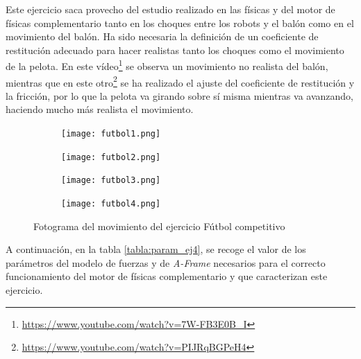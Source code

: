 Este ejercicio saca provecho del estudio realizado en las físicas y del motor de físicas complementario tanto en los choques entre los robots y el balón como en el movimiento del balón. Ha sido necesaria la definición de un coeficiente de restitución adecuado para hacer realistas tanto los choques como el movimiento de la pelota. En este vídeo\footnote{\url{https://www.youtube.com/watch?v=7W-FB3E0B_I}} se observa un movimiento no realista del balón, mientras que en este otro\footnote{\url{https://www.youtube.com/watch?v=PIJRqBGPeH4}} se ha realizado el ajuste del coeficiente de restitución y la fricción, por lo que la pelota va girando sobre sí misma mientras va avanzando, haciendo mucho más realista el movimiento.

\clearpage

\begin{figure}[h!]
  \begin{subfigure}[b]{0.2\textwidth}
    \texttt{[image: futbol1.png]}
  \end{subfigure}
  \hfill
  \hfill
  \begin{subfigure}[b]{0.2\textwidth}
    \texttt{[image: futbol2.png]}
  \end{subfigure}
    \hfill
    \hfill
  \begin{subfigure}[b]{0.2\textwidth}
    \texttt{[image: futbol3.png]}
  \end{subfigure}
    \hfill
  \begin{subfigure}[b]{0.2\textwidth}
    \texttt{[image: futbol4.png]}
  \end{subfigure}
\caption{Fotograma del movimiento del ejercicio Fútbol competitivo}
\label{fig:movimiento_balón}
\end{figure}

A continuación, en la tabla \ref{tabla:param_ej4}, se recoge el valor de los parámetros del modelo de fuerzas y de  \textit{A-Frame} necesarios para el correcto funcionamiento del motor de físicas complementario y que caracterizan este ejercicio.

